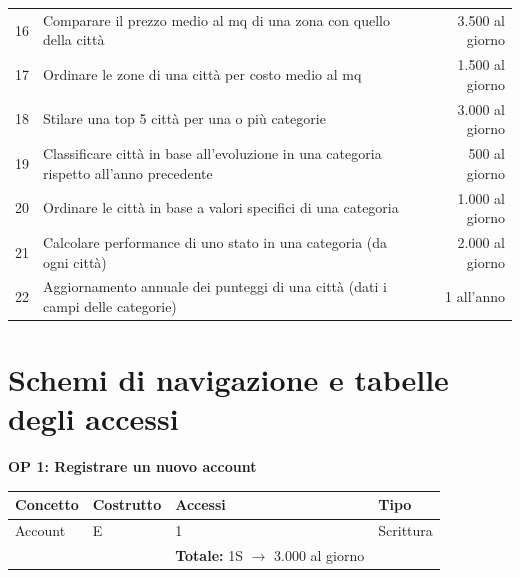 \documentclass[a4paper,12pt]{report}
\begin{document}
\begin{table}[H]
\begin{adjustbox}{width=1.45\textwidth,center}
\begin{tabular}{clr}
             16 & Comparare il prezzo medio al mq di una zona con quello della città & 3.500 al giorno \\ 
             17 & Ordinare le zone di una città per costo medio al mq & 1.500 al giorno \\
             18 & Stilare una top 5 città per una o più categorie & 3.000 al giorno \\
             19 & Classificare città in base all'evoluzione in una categoria rispetto all'anno precedente & 500 al giorno \\ 
             20 & Ordinare le città in base a valori specifici di una categoria & 1.000 al giorno \\ 
             21 & Calcolare performance di uno stato in una categoria (da ogni città) & 2.000 al giorno \\ 
             22 & Aggiornamento annuale dei punteggi di una città (dati i campi delle categorie) & 1 all'anno \\ [1ex]
            \end{tabular}
            \end{adjustbox}
            \end{table}
        
        \newpage
    	\section{Schemi di navigazione e tabelle degli accessi}	

        \noindent
        \textbf{OP 1: Registrare un nuovo account}
        	\begin{table}[H]
            \centering
             \begin{tabular}{llll}
             \rowcolor{yellow!20}\textbf{Concetto} & \textbf{Costrutto} & \textbf{Accessi} & \textbf{Tipo} \\ [0.5ex] 
             \hline
             Account & E & 1 & Scrittura \\ 
             \hline
             \rowcolor{yellow!20}\rowcolor{yellow!20} &   & \textbf{Totale:} 1S $\rightarrow$ 3.000 al giorno &  \\ [1ex] 
             \end{tabular}
            \end{table}
            
\end{document}
